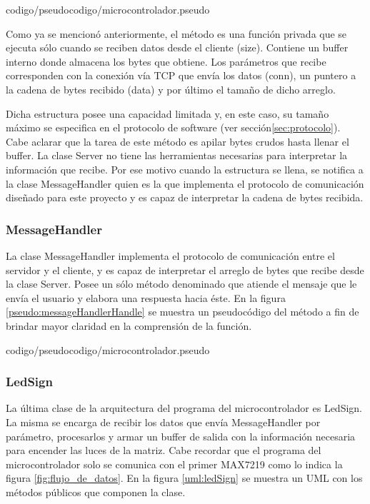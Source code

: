  {codigo/pseudocodigo/microcontrolador.pseudo}

Como ya se mencionó anteriormente, el método  es una función privada que se ejecuta sólo cuando se reciben datos desde el cliente (size).
Contiene un buffer interno donde almacena los bytes que obtiene.
Los parámetros que recibe corresponden con la conexión vía TCP que envía los datos (conn), un puntero a la cadena de bytes recibido (data) y por último el tamaño de dicho arreglo.

Dicha estructura posee una capacidad limitada y, en este caso, su tamaño máximo se especifica en el protocolo de software (ver sección\ref{sec:protocolo}).
Cabe aclarar que la tarea de este método es apilar bytes crudos hasta llenar el buffer. La clase Server no tiene las herramientas necesarias para interpretar la información que recibe.
Por ese motivo cuando la estructura se llena, se notifica a la clase MessageHandler quien es la que implementa el protocolo de comunicación diseñado para este proyecto y es capaz de interpretar la cadena de bytes recibida.



\subsubsection{MessageHandler}

La clase MessageHandler implementa el protocolo de comunicación entre el servidor y el cliente, y es capaz de interpretar el arreglo de bytes que recibe desde la clase Server.
Posee un sólo método denominado  que atiende el mensaje que le envía el usuario y elabora una respuesta hacia éste.
En la figura \ref{pseudo:messageHandlerHandle} se muestra un pseudocódigo del método a fin de brindar mayor claridad en la comprensión de la función.

 {codigo/pseudocodigo/microcontrolador.pseudo}



\subsubsection{LedSign}

La última clase de la arquitectura del programa del microcontrolador es LedSign.
La misma se encarga de recibir los datos que envía MessageHandler por parámetro, procesarlos y armar un buffer de salida con la información necesaria para encender las luces de la matriz.
Cabe recordar que el programa del microcontrolador solo se comunica con el primer MAX7219 como lo indica la figura \ref{fig:flujo_de_datos}.
En la figura \ref{uml:ledSign} se muestra un UML con los métodos públicos que componen la clase.

